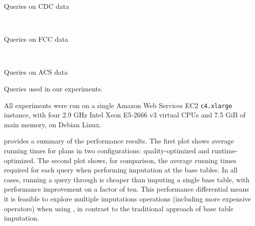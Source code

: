\begin{table}
\centering
 \begin{subtable}{\linewidth}
  
  \caption{Queries on CDC data}
  \label{fig:queries-cdc}
 \end{subtable}
 ~
 \begin{subtable}{\linewidth}
 
 \caption{Queries on FCC data}
 \label{fig:queries-fcc}
 \end{subtable}
 ~
 \begin{subtable}{\linewidth}
 
 \caption{Queries on ACS data}
 \label{fig:query-acs}
 \end{subtable}

  \caption{Queries used in our experiments.}
  \label{fig:queries}
\end{table}

%  

All experiments were run on a single Amazon Web Services EC2 {\tt c4.xlarge} instance, with
four 2.9 GHz Intel Xeon E5-2666 v3 virtual CPUs and 7.5 GiB of main memory, on Debian Linux.

 provides a summary of the performance results. The first plot
shows average running times for \ProjectName{} plans in two configurations:
quality-optimized and runtime-optimized. The second plot shows, for comparison, the average
running times required for each query when performing imputation at the base tables.  In all
cases, running a query through \ProjectName{} is cheaper than imputing a single base table,
with performance improvement on a factor of ten. This performance differential means it is feasible
to explore multiple imputations operations (including more expensive operators) when using
\ProjectName{}, in contrast to the traditional approach of base table imputation.

